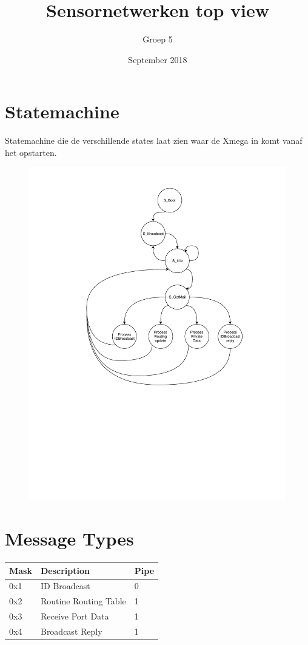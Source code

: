 \documentclass{article}
\title{Sensornetwerken top view}
\author{Groep 5}
\date{September 2018}
\begin{document}
\maketitle
\clearpage
{}
\clearpage

\section*{Statemachine}
Statemachine die de verschillende states laat zien waar de Xmega in komt vanaf het opstarten.
\begin{figure}[h]
	\includegraphics[width=.8\textwidth, keepaspectratio]{media/Pstate.pdf}
    \caption{}
\end{figure}
\newpage

\section*{Message Types}
\begin{table}[h]
\begin{tabular}{|l|l|l|}
\hline
\rowcolor[HTML]{EFEFEF} 
Mask & Description           & Pipe \\ \hline
0x1  & ID Broadcast          & 0    \\ \hline
0x2  & Routine Routing Table & 1    \\ \hline
0x3  & Receive Port Data     & 1    \\ \hline
0x4  & Broadcast Reply       & 1    \\ \hline
\end{tabular}
\end{table}
\end{document}
